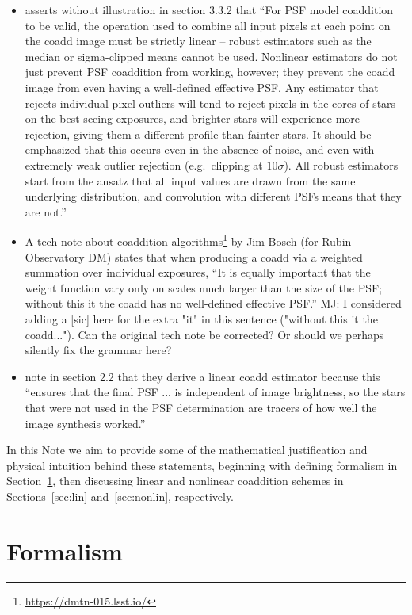\documentclass[modern]{style_and_logos/lsstdescnote}
\newcommand{\mike}[1]{{\color{cyan}MJ: #1}}
\begin{document}
\begin{itemize}
\item \citet{2018PASJ...70S...5B} asserts without illustration in section 3.3.2 that ``For PSF model coaddition to be valid, the operation used to
combine all input pixels at each point on the coadd image must
be strictly linear – robust estimators such as the median or
sigma-clipped means cannot be used. Nonlinear estimators do
not just prevent PSF coaddition from working, however; they
prevent the coadd image from even having a well-defined effective PSF. Any estimator that rejects individual pixel outliers will tend to reject pixels in the cores of stars on the best-seeing exposures, and brighter stars will experience more rejection, giving
them a different profile than fainter stars. It should be emphasized that this occurs even in the absence of noise, and even
with extremely weak outlier rejection (e.g.\ clipping at $10\sigma$). All
robust estimators start from the ansatz that all input values are
drawn from the same underlying distribution, and convolution
with different PSFs means that they are not.''    

\item A tech note about coaddition algorithms\footnote{\url{https://dmtn-015.lsst.io/}} by Jim Bosch (for Rubin Observatory DM) states that when producing a coadd via a weighted summation over individual exposures, ``It is equally important that the weight function vary only on scales much larger than the size of the PSF; without this it the coadd has no well-defined effective PSF.'' \mike{I considered adding a [sic] here for the extra "it" in this sentence ("without this it the coadd...").  Can the original tech note be corrected?  Or should we perhaps silently fix the grammar here?}

\item \citet{2011ApJ...741...46R} note in section 2.2 that they derive a linear coadd estimator because this ``ensures that the final PSF ... is independent of image brightness, so the stars that were not used in the PSF determination are tracers of how well the image synthesis worked.''

\end{itemize}

In this Note we aim to provide some of the mathematical justification and physical intuition behind these statements, beginning with defining formalism in Section~\ref{sec:formalism}, then discussing linear and nonlinear coaddition schemes in Sections~\ref{sec:lin} and~\ref{sec:nonlin}, respectively.

\section{Formalism}\label{sec:formalism}
\end{document}
